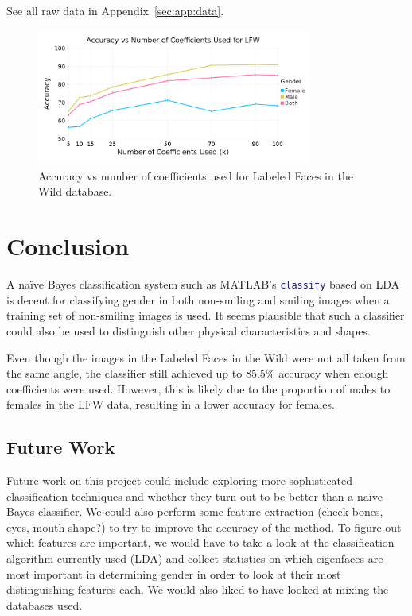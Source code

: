 \documentclass[hidelinks,11pt]{article}
\begin{document}
See all raw data in Appendix~\ref{sec:app:data}.

\begin{figure}[!ht]
  \centering
  \includegraphics[width=0.8\textwidth]{accuracy_k_lfw.png}
  \caption{Accuracy vs number of coefficients used for Labeled Faces in the
  Wild database.}
  \label{fig:analysis:lda:accuracy_lfw}
\end{figure}

\section{Conclusion}
\label{sec:conclusion}

A na\"ive Bayes classification system such as MATLAB's
\lstinline[language=Matlab]!classify! based on LDA is decent for classifying
gender in both non-smiling and smiling images when a training set of non-smiling
images is used. It seems plausible that such a classifier could also be used to
distinguish other physical characteristics and shapes. 

Even though the images in the Labeled Faces in the Wild were not all taken from
the same angle, the classifier still achieved up to 85.5\% accuracy when enough
coefficients were used. However, this is likely due to the proportion of males
to females in the LFW data, resulting in a lower accuracy for females.

\subsection{Future Work}
\label{sec:conclusion:future}

Future work on this project could include exploring more sophisticated
classification techniques and whether they turn out to be better than a na\"ive
Bayes classifier. We could also perform some feature extraction (cheek bones,
eyes, mouth shape?) to try to improve the accuracy of the method. To figure out
which features are important, we would have to take a look at the classification
algorithm currently used (LDA) and collect statistics on which eigenfaces are
most important in determining gender in order to look at their most
distinguishing features each. 
We would also liked to have looked at mixing the databases used.
\end{document}

